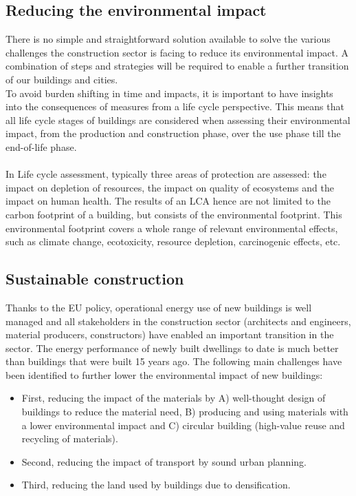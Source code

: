 \documentclass[../summary.tex]{subfiles}
\begin{document}
	\subsection{Reducing the environmental impact}
	
	There is no simple and straightforward solution available to solve the various challenges the construction sector is facing to reduce its environmental impact. A combination of steps and strategies will be required to enable a further transition of our buildings and cities.
	\\
	To avoid burden shifting in time and impacts, it is important to have insights into the consequences of measures from a life cycle perspective. This means that all life cycle stages of buildings are considered when assessing their environmental impact, from the production and construction phase, over the use phase till the end-of-life phase. 
	\\\\
	In Life cycle assessment, typically three areas of protection are assessed: the impact on depletion of resources, the impact on quality of ecosystems and the impact on human health. The results of an LCA hence are not limited to the carbon footprint of a building, but consists of the environmental footprint. This environmental footprint covers a whole range of relevant environmental effects, such as climate change, ecotoxicity, resource depletion, carcinogenic effects, etc.
	
	\subsection{Sustainable construction}
	
	Thanks to the EU policy, operational energy use of new buildings is well managed and all stakeholders in the construction sector (architects and engineers, material producers, constructors) have enabled an important transition in the sector. The energy performance of newly built dwellings to date is much better than buildings that were built 15 years ago. The following main challenges have been identified to further lower the environmental impact of new buildings:
	\begin{itemize}
	\item First, reducing the impact of the materials by A) well-thought design of buildings to reduce the material need, B) producing and using materials with a lower environmental impact and C) circular building (high-value reuse and recycling of materials).
	\item Second, reducing the impact of transport by sound urban planning.
	\item Third, reducing the land used by buildings due to densification.
	\end{itemize}
	
\end{document}
